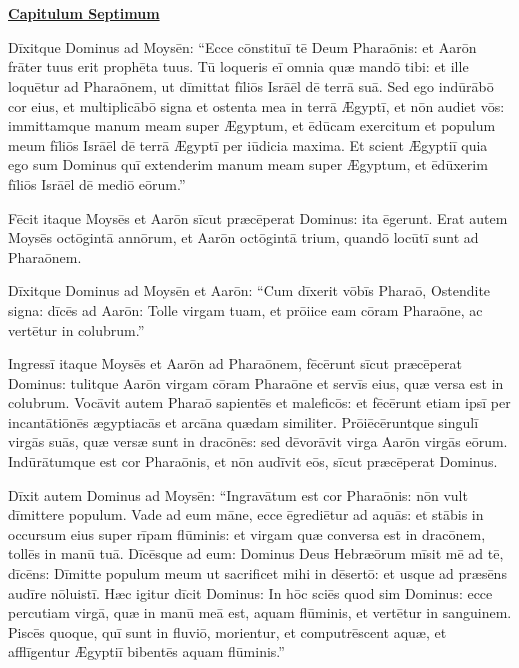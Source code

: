 \chapter{}


{\begin{center}\large\bf\underline{Capitulum Septimum}\end{center}%

Dīxitque Dominus ad Moysēn: ``Ecce cōnstituī tē Deum Pharaōnis: et Aarōn
frāter tuus erit prophēta tuus. Tū loqueris eī omnia quæ mandō tibi:
et ille loquētur ad Pharaōnem, ut dīmittat fīliōs Isrāēl dē terrā suā. 
Sed ego indūrābō cor eius, et multiplicābō signa et ostenta mea in terrā
Ægyptī, et nōn audiet vōs: immittamque manum meam super Ægyptum, et
ēdūcam exercitum et populum meum fīliōs Isrāēl dē terrā Ægyptī per
iūdicia maxima. Et scient Ægyptiī quia ego sum Dominus quī extenderim
manum meam super Ægyptum, et ēdūxerim fīliōs Isrāēl dē mediō eōrum.''

Fēcit itaque Moysēs et Aarōn sīcut præcēperat Dominus: ita ēgerunt. 
Erat autem Moysēs octōgintā annōrum, et Aarōn octōgintā trium, quandō
locūtī sunt ad Pharaōnem.

Dīxitque Dominus ad Moysēn et Aarōn: ``Cum dīxerit vōbīs Pharaō,
Ostendite signa: dīcēs ad Aarōn: Tolle virgam tuam, et prōiice eam
cōram Pharaōne, ac vertētur in
colubrum.''

Ingressī itaque Moysēs et
Aarōn ad Pharaōnem, fēcērunt sīcut præcēperat Dominus: tulitque Aarōn
virgam cōram Pharaōne et servīs eius, quæ versa est in colubrum.
Vocāvit autem Pharaō sapientēs et maleficōs: et fēcērunt etiam ipsī per
incantātiōnēs ægyptiacās et arcāna quædam similiter. Prōiēcēruntque
singulī virgās suās, quæ versæ sunt in dracōnēs: sed dēvorāvit virga
Aarōn virgās eōrum. Indūrātumque est cor Pharaōnis, et nōn audīvit
eōs, sīcut præcēperat Dominus.

Dīxit autem Dominus ad Moysēn: ``Ingravātum est cor Pharaōnis: nōn vult
dīmittere populum. Vade ad eum māne, ecce ēgrediētur ad aquās: et
stābis in occursum eius super rīpam flūminis: et virgam quæ conversa
est in dracōnem, tollēs in manū tuā.  Dīcēsque ad eum: Dominus Deus
Hebræōrum mīsit mē ad tē, dīcēns: Dīmitte populum meum ut sacrificet
mihi in dēsertō: et usque ad præsēns audīre nōluistī. Hæc igitur
dīcit Dominus: In hōc sciēs quod sim Dominus: ecce percutiam virgā,
quæ in manū meā est, aquam flūminis, et vertētur in sanguinem. Piscēs
quoque, quī sunt in fluviō, morientur, et computrēscent aquæ, et
afflīgentur Ægyptiī bibentēs aquam flūminis.''

}
